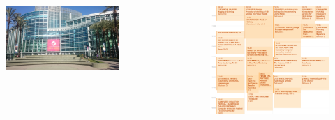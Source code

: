 {\begin{minipage}[0.2\textheight]{\textwidth}
\begin{columns}[T]
\begin{column}{0.6\textwidth}
				\centering
				\includegraphics[width=0.7\textwidth]{img/confcenter.jpg}
			\end{column}
			\begin{column}{0.4\textwidth}  			
				\begin{figure}
					\centering
					\includegraphics[width=\textwidth]{img/cal2.png}
				\end{figure}
			\end{column}
		\end{columns}
	\end{minipage}
}
